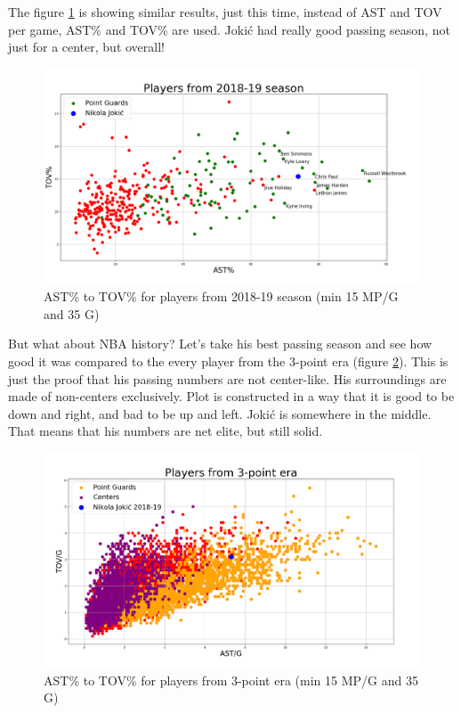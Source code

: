 \documentclass[a4paper]{article}
\begin{document}
The figure \ref{plt:ast_tov_pct} is showing similar results, just this time, instead of AST and TOV per game, AST\% and TOV\% are used. Joki\' c had really good passing season, not just for a center, but overall!

\begin{figure}[h!]
\begin{center}
\includegraphics[scale=0.30]{ast_tov_pct_2019.png}
\end{center}
\caption{AST\% to TOV\% for players from 2018-19 season (min 15 MP/G and 35 G)}
\label{plt:ast_tov_pct}
\end{figure}

But what about NBA history? Let's take his best passing season and see how good it was compared to the every player from the 3-point era (figure \ref{plt:ast_tov_g_3p}). This is just the proof that his passing numbers are not center-like. His surroundings are made of non-centers exclusively. Plot is constructed in a way that it is good to be down and right, and bad to be up and left. Joki\' c is somewhere in the middle. That means that his numbers are net elite, but still solid.

\begin{figure}[h!]
\begin{center}
\includegraphics[scale=0.30]{ast_tov_g_3point_era.png}
\end{center}
\caption{AST\% to TOV\% for players from 3-point era (min 15 MP/G and 35 G)}
\label{plt:ast_tov_g_3p}
\end{figure}
\end{document}
